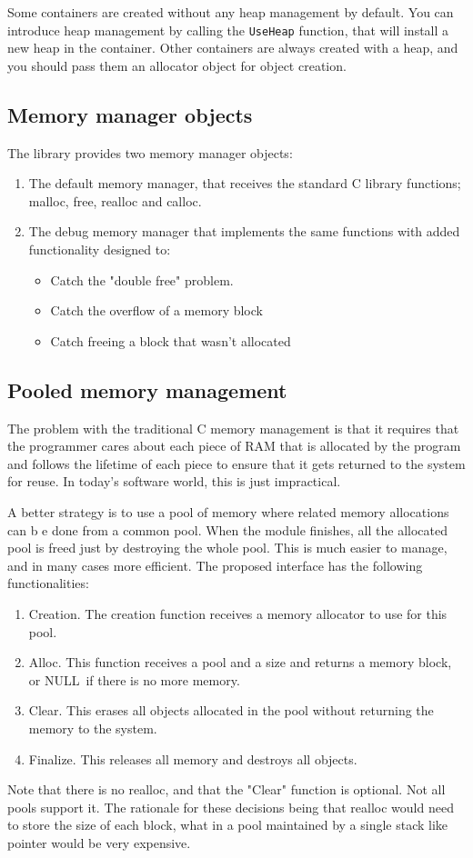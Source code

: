 \documentclass[12pt,a4paper,openany]{memoir} %
\newif\iftth
\newcommand{\Null}{{\iftth \ NULL \else \footnotesize NULL\  \fi}}
\begin{document}
Some containers are created without any heap management by default. You can introduce heap management by calling the \verb,UseHeap, function, that will install a new heap in the container. Other containers are always created with a heap, and you should pass them an allocator object for object creation.

\subsection{Memory manager objects}
The library provides two memory manager objects:
\begin{enumerate}
\item The default memory manager, that receives the standard C library functions; malloc, free, realloc and calloc.
\item The debug memory manager that implements the same functions with added functionality designed to:
\begin{itemize}
\item
Catch the "double free" problem.
\item
Catch the overflow of a memory block
\item
Catch freeing a block that wasn't allocated
\end{itemize}
\end{enumerate}
\subsection{Pooled memory management}
The problem with the traditional C memory management is that it requires that the programmer cares about each piece of RAM that is allocated by the program and follows the lifetime of each piece to ensure that it gets returned to the system for reuse. In today's software world, this is just impractical.

A better strategy is to use a pool of memory where related memory allocations can b e done from a common pool. When the module finishes, all the allocated pool is freed just by destroying the whole pool. This is much easier to manage, and in many cases more efficient.
The proposed interface has the following functionalities:
\begin{enumerate}
\item Creation. The creation function receives a memory allocator to use for this pool.
\item Alloc. This function receives a pool and a size and returns a memory block, or \Null if there is no more memory.
\item Clear. This erases all objects allocated in the pool without returning the memory to the system.
\item Finalize. This releases all memory and destroys all objects.
\end{enumerate}
Note that there is no realloc, and that the "Clear" function is optional. Not all pools support it. The rationale for these decisions being that realloc would need to store the size of each block, what in a pool maintained by a single stack like pointer would be very expensive.
\end{document}
